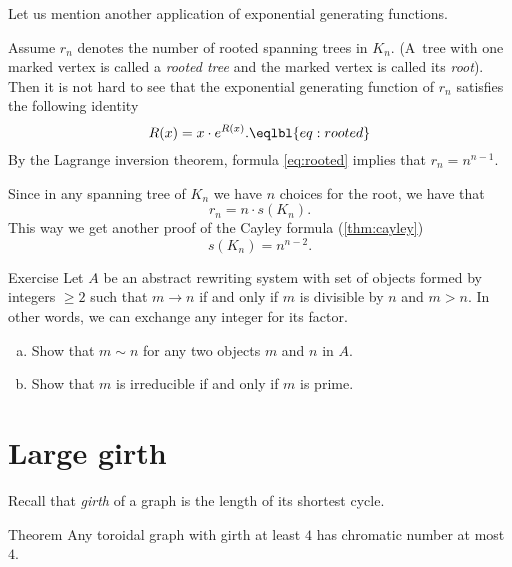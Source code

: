 






Let us mention another application of exponential generating functions.

Assume $r_n$ denotes the number of rooted spanning trees in $K_n$.
(A~tree with one marked vertex is called a \emph{rooted tree} and the marked vertex is called its {}\emph{root}).
Then it is not hard to see that the exponential generating function of $r_n$ satisfies the following identity
\[R(x)=x\cdot e^{R(x)}.
\eqlbl{eq:rooted}\]
By the Lagrange inversion theorem, formula \ref{eq:rooted} implies that $r_n=n^{n-1}$.

Since in any spanning tree of $K_n$ we have $n$ choices for the root, we have that
\[r_n=n\cdot s(K_n).\]
This way we get another proof of the Cayley formula (\ref{thm:cayley}) \[s(K_n)=n^{n-2}.\]











\begin{thm}{Exercise}
Let $A$ be an abstract rewriting system
with set of objects formed by integers $\ge 2$
such that $m\to n$ if and only if $m$ is divisible by $n$ and $m>n$.
In other words, we can exchange any integer for its factor.

\begin{enumerate}[(a)]
\item Show that $m\sim n$ for any two objects $m$ and $n$ in $A$.
\item Show that $m$ is irreducible if and only if $m$ is prime.
\end{enumerate}

\end{thm}














\section{Large girth}

Recall that \emph{girth} of a graph is the length of its shortest cycle.

\begin{thm}{Theorem}
Any toroidal graph with girth at least $4$ has chromatic number at most $4$.
\end{thm}


